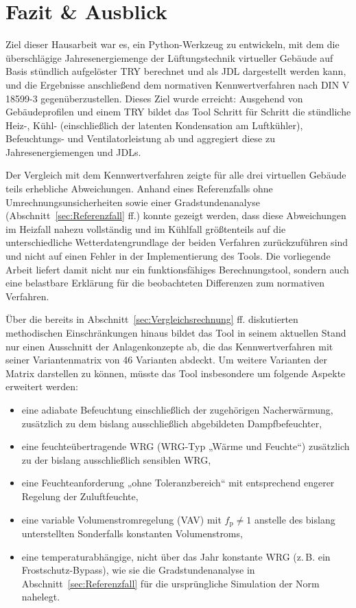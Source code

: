 \documentclass{scrreprt}
\begin{document}
\chapter{Fazit \& Ausblick}\label{chap:Fazit}

Ziel dieser Hausarbeit war es, ein Python-Werkzeug zu entwickeln, mit
dem die überschlägige Jahresenergiemenge der Lüftungstechnik
virtueller Gebäude auf Basis stündlich aufgelöster \ac{TRY} berechnet
und als \ac{JDL} dargestellt werden kann, und die Ergebnisse
anschließend dem normativen Kennwertverfahren nach DIN V 18599-3
gegenüberzustellen. Dieses Ziel wurde erreicht: Ausgehend von
Gebäudeprofilen und einem \ac{TRY} bildet das Tool Schritt für Schritt
die stündliche Heiz-, Kühl- (einschließlich der latenten Kondensation
am Luftkühler), Befeuchtungs- und Ventilatorleistung ab und aggregiert
diese zu Jahresenergiemengen und \acp{JDL}.

Der Vergleich mit dem Kennwertverfahren zeigte für alle drei
virtuellen Gebäude teils erhebliche Abweichungen. Anhand eines
Referenzfalls ohne Umrechnungsunsicherheiten sowie einer
Gradstundenanalyse (Abschnitt~\ref{sec:Referenzfall} ff.) konnte
gezeigt werden, dass diese Abweichungen im Heizfall nahezu
vollständig und im Kühlfall größtenteils auf die unterschiedliche
Wetterdatengrundlage der beiden Verfahren zurückzuführen sind und
nicht auf einen Fehler in der Implementierung des Tools. Die
vorliegende Arbeit liefert damit nicht nur ein funktionsfähiges
Berechnungstool, sondern auch eine belastbare Erklärung für die
beobachteten Differenzen zum normativen Verfahren.

Über die bereits in Abschnitt~\ref{sec:Vergleichsrechnung} ff.
diskutierten methodischen Einschränkungen hinaus bildet das Tool in
seinem aktuellen Stand nur einen Ausschnitt der Anlagenkonzepte ab,
die das Kennwertverfahren mit seiner Variantenmatrix von 46 Varianten
abdeckt. Um weitere Varianten der Matrix darstellen zu können, müsste
das Tool insbesondere um folgende Aspekte erweitert werden:

\begin{itemize}
    \item eine adiabate Befeuchtung einschließlich der zugehörigen
    Nacherwärmung, zusätzlich zu dem bislang ausschließlich
    abgebildeten Dampfbefeuchter,
    \item eine feuchteübertragende \ac{WRG} (WRG-Typ „Wärme und
    Feuchte“) zusätzlich zu der bislang ausschließlich sensiblen
    \ac{WRG},
    \item eine Feuchteanforderung „ohne Toleranzbereich“ mit
    entsprechend engerer Regelung der Zuluftfeuchte,
    \item eine variable Volumenstromregelung (\ac{VAV}) mit
    $f_{\mathrm{p}} \neq 1$ anstelle des bislang unterstellten
    Sonderfalls konstanten Volumenstroms,
    \item eine temperaturabhängige, nicht über das Jahr konstante
    \ac{WRG} (z.\,B. ein Frostschutz-Bypass), wie sie die
    Gradstundenanalyse in Abschnitt~\ref{sec:Referenzfall} für die
    ursprüngliche Simulation der Norm nahelegt.
\end{itemize}
\end{document}
